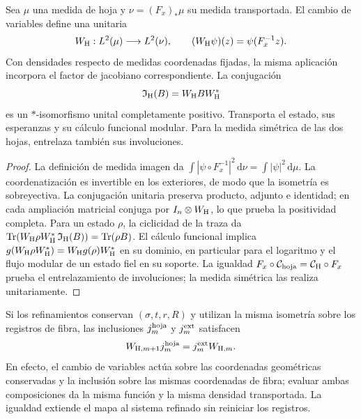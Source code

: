 \begin{proposition}
\label{vii:prop:transporte-unitario-horizonte}
Sea \(\mu\) una medida de hoja y \(\nu=(F_x)_*\mu\) su medida
transportada. El cambio de variables define una unitaria
\begin{equation}
 W_{\rm H}:L^2(\mu)\longrightarrow L^2(\nu),\qquad
 (W_{\rm H}\psi)(z)=\psi(F_x^{-1}z).
 \label{vii:eq:unitaria-horizonte}
\end{equation}
Con densidades respecto de medidas coordenadas fijadas, la misma
aplicación incorpora el factor de jacobiano correspondiente.
La conjugación
\begin{equation}
 \mathfrak I_{\rm H}(B)=W_{\rm H}BW_{\rm H}^*
 \label{vii:eq:mapa-observables-horizonte}
\end{equation}
es un \(*\)-isomorfismo unital completamente positivo. Transporta el
estado, sus esperanzas y su cálculo funcional modular. Para la medida
simétrica de las dos hojas, entrelaza también sus involuciones.
\end{proposition}
\begin{proof}
La definición de medida imagen da
\(\int|\psi\circ F_x^{-1}|^2\,\mathrm d\nu
=\int|\psi|^2\,\mathrm d\mu\).
La coordenatización es invertible en los exteriores, de modo que la isometría es
sobreyectiva. La conjugación unitaria preserva producto, adjunto e
identidad; en cada ampliación matricial conjuga por
\(I_n\otimes W_{\rm H}\), lo que prueba la positividad completa.
Para un estado \(\rho\), la ciclicidad de la traza da
\(\operatorname{Tr}(W_{\rm H}\rho W_{\rm H}^*
\,\mathfrak I_{\rm H}(B))=\operatorname{Tr}(\rho B)\).
El cálculo funcional implica
\(g(W_{\rm H}\rho W_{\rm H}^*)=W_{\rm H}g(\rho)W_{\rm H}^*\)
en su dominio, en particular para el logaritmo y el flujo modular de
un estado fiel en su soporte. La igualdad
\(F_x\circ\mathcal C_{\rm hoja}=\mathcal C_{\rm H}\circ F_x\)
prueba el entrelazamiento de involuciones; la medida simétrica las realiza
unitariamente.
\end{proof}

Si los refinamientos conservan \((\sigma,t,r,R)\) y utilizan la misma
isometría sobre los registros de fibra, las inclusiones
\(j_m^{\rm hoja}\) y \(j_m^{\rm ext}\) satisfacen
\begin{equation}
 W_{{\rm H},m+1}j_m^{\rm hoja}
 =j_m^{\rm ext}W_{{\rm H},m}.
 \label{vii:eq:naturalidad-horizonte}
\end{equation}
En efecto, el cambio de variables actúa sobre las coordenadas geométricas
conservadas y la inclusión sobre las mismas coordenadas de fibra; evaluar
ambas composiciones da la misma función y la misma densidad transportada.
La igualdad extiende el mapa al sistema refinado sin reiniciar los registros.

